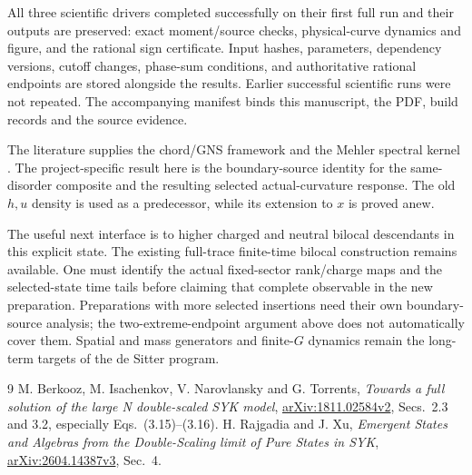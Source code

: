 \documentclass[11pt]{article}
\begin{document}
All three scientific drivers completed successfully on their first
full run and their outputs are preserved: exact moment/source checks,
physical-curve dynamics and figure, and the rational sign certificate.
Input hashes, parameters, dependency versions, cutoff changes,
phase-sum conditions, and authoritative rational endpoints are stored
alongside the results. Earlier successful scientific runs were not
repeated. The accompanying manifest binds this manuscript, the PDF,
build records and the source evidence.

The literature supplies the chord/GNS framework \cite{RX} and the
Mehler spectral kernel \cite{BINT}. The project-specific result here is
the boundary-source identity for the same-disorder composite and the
resulting selected actual-curvature response. The old $h,u$ density is
used as a predecessor, while its extension to $x$ is proved anew.

The useful next interface is to higher charged and neutral bilocal
descendants in this explicit state. The existing full-trace finite-time
bilocal construction remains available. One must identify the actual
fixed-sector rank/charge maps and the selected-state time tails before
claiming that complete observable in the new preparation. Preparations
with more selected insertions need their own boundary-source analysis;
the two-extreme-endpoint argument above does not automatically cover
them. Spatial and mass generators and finite-$G$ dynamics remain the
long-term targets of the de Sitter program.

\begin{thebibliography}{9}
 M. Berkooz, M. Isachenkov, V. Narovlansky and G. Torrents,
\emph{Towards a full solution of the large N double-scaled SYK model},
\href{https://arxiv.org/abs/1811.02584}{arXiv:1811.02584v2},
Secs.~2.3 and 3.2, especially Eqs.~(3.15)--(3.16).
 H. Rajgadia and J. Xu,
\emph{Emergent States and Algebras from the Double-Scaling limit of Pure States in SYK},
\href{https://arxiv.org/abs/2604.14387}{arXiv:2604.14387v3}, Sec.~4.
\end{thebibliography}
\end{document}
